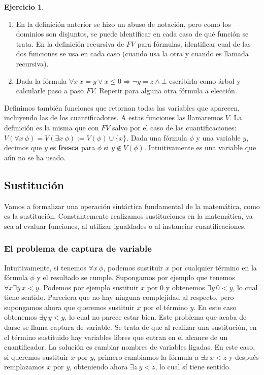 \documentclass[a4paper, 12pt]{report}
\newcommand{\Ra}{\Rightarrow}
\theoremstyle{definition}
\newtheorem{ejercicio}{Ejercicio}[section]
\begin{document}
\begin{ejercicio}
	\begin{enumerate}
		\item En la definición anterior se hizo un abuso de notación, pero como los dominios son disjuntos, se puede identificar en cada caso de qué función se trata. En la definición recursiva de $FV$ para fórmulas, identificar cual de las dos funciones se usa en cada caso (cuando usa la otra y cuando es llamada recursiva).
		\item Dada la fórmula $\forall x ~x=y\vee x\leq 0\Ra \lnot y=z\wedge \bot$ escribirla como árbol y calcularle paso a paso $FV$. Repetir para alguna otra fórmula a elección.
	\end{enumerate}
\end{ejercicio}

Definimos también funciones que retornan todas las variables que aparecen, incluyendo las de los cuantificadores. A estas funciones las llamaremos $V$. La definición es la misma que con $FV$ salvo por el caso de las cuantificaciones: $V(\forall x~\phi)=V(\exists x~\phi):=V(\phi)\cup\{x\}$. Dada una fórmula $\phi$ y una variable $y$, decimos que $y$ es \textbf{fresca} para $\phi$ si $y\not\in V(\phi)$. Intuitivamente es una variable que aún no se ha usado.


\subsection{Sustitución}

Vamos a formalizar una operación sintáctica fundamental de la matemática, como es la sustitución. Constantemente realizamos sustituciones en la matemática, ya sea al evaluar funciones, al utilizar igualdades o al instanciar cuantificaciones.

\subsubsection{El problema de captura de variable}

Intuitivamente, si tenemos $\forall x~\phi$, podemos sustituir $x$ por cualquier término en la fórmula $\phi$ y el resultado se cumple. Supongamos por ejemplo que tenemos $\forall x\exists y~ x<y$. Podemos por ejemplo sustituir $x$ por $0$ y obtenemos $\exists y~0<y$, lo cual tiene sentido. Pareciera que no hay ninguna complejidad al respecto, pero supongamos ahora que queremos sustituir $x$ por el término $y$. En este caso obtenemos $\exists y~y<y$, lo cual no parece estar bien. Este problema que acaba de darse se llama captura de variable. Se trata de que al realizar una sustitución, en el término sustituido hay variables libres que entran en el alcance de un cuantificador. La solución es cambiar nombres de variables ligadas. En este caso, si queremos sustituir $x$ por $y$, primero cambiamos la fórmula a $\exists z~x<z$ y después remplazamos $x$ por $y$, obteniendo ahora $\exists z~y<z$, lo cual sí tiene sentido.
\end{document}
